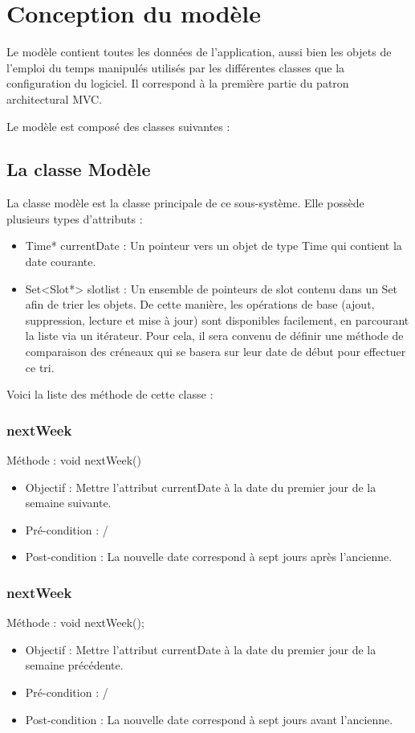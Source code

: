 \chapter{Conception du modèle}
	
	Le modèle contient toutes les données de l'application, aussi bien les objets de l'emploi du temps manipulés utilisés par les différentes classes que la configuration du logiciel. Il correspond à la première partie du patron architectural MVC. 
	
	Le modèle est composé des classes suivantes :
	
	\section{La classe Modèle}
	La classe modèle est la classe principale de ce sous-système. Elle possède plusieurs types d'attributs :
	\begin{itemize}
		\item Time* currentDate : Un pointeur vers un objet de type Time qui contient la date courante.
        \item Set<Slot*> slotlist : Un ensemble de pointeurs de slot contenu dans un Set afin de trier les objets. De cette manière, les opérations de base (ajout, suppression, lecture et mise à jour) sont disponibles facilement, en parcourant la liste via un itérateur. Pour cela, il sera convenu de définir une méthode de comparaison des créneaux qui se basera sur leur date de début pour effectuer ce tri.
	\end{itemize}
	
	Voici la liste des méthode de cette classe :
		\subsection*{nextWeek}
            Méthode : void nextWeek()
			\begin{itemize}
				\item Objectif  : Mettre l'attribut currentDate à la date du premier jour de la semaine suivante.
				\item Pré-condition : /
				\item Post-condition : La nouvelle date correspond à sept jours après l'ancienne.
			\end{itemize}
			
   		\subsection*{nextWeek}
            Méthode : void nextWeek();
			\begin{itemize}
				\item Objectif  : Mettre l'attribut currentDate à la date du premier jour de la semaine précédente.
				\item Pré-condition : /
				\item Post-condition : La nouvelle date correspond à sept jours avant l'ancienne.
			\end{itemize}
